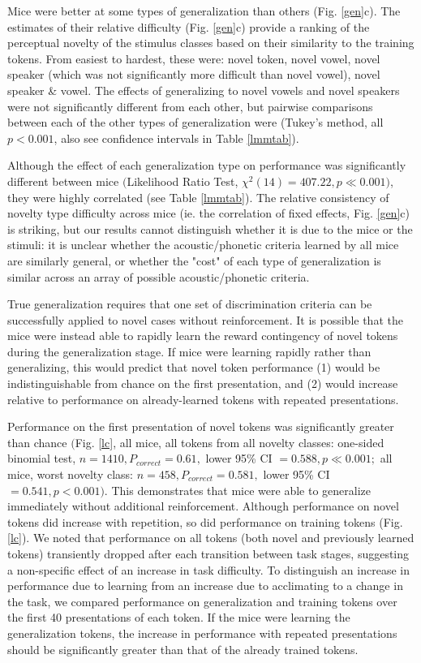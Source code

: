 Mice were better at some types of generalization than others (Fig. \ref{gen}c). The estimates of their relative difficulty (Fig. \ref{gen}c) provide a ranking of the perceptual novelty of the stimulus classes based on their similarity to the training tokens. From easiest to hardest, these were: novel token, novel vowel, novel speaker (which was not significantly more difficult than novel vowel), novel speaker \& vowel. The effects of generalizing to novel vowels and novel speakers were not significantly different from each other, but pairwise comparisons between each of the other types of generalization were (Tukey's method, all $p < 0.001$, also see confidence intervals in Table \ref{lmmtab}).

Although the effect of each generalization type on performance was significantly different between mice $($Likelihood Ratio Test, $\chi^2(14) = 407.22, p \ll 0.001)$, they were highly correlated (see Table \ref{lmmtab}). The relative consistency of novelty type difficulty across mice (ie. the correlation of fixed effects, Fig. \ref{gen}c) is striking, but our results cannot distinguish whether it is due to the mice or the stimuli: it is unclear whether the acoustic/phonetic criteria learned by all mice are similarly general, or whether the "cost" of each type of generalization is similar across an array of possible acoustic/phonetic criteria.

True generalization requires that one set of discrimination criteria can be successfully applied to novel cases without reinforcement. It is possible that the mice were instead able to rapidly learn the reward contingency of novel tokens during the generalization stage. If mice were learning rapidly rather than generalizing, this would predict that novel token performance (1) would be indistinguishable from chance on the first presentation, and (2) would increase relative to performance on already-learned tokens with repeated presentations.


Performance on the first presentation of novel tokens was significantly greater than chance $($Fig. \ref{lc}, all mice, all tokens from all novelty classes: one-sided binomial test, $n=1410, P_{correct} = 0.61,$ lower 95\% CI $= 0.588, p \ll 0.001;$ all mice, worst novelty class:  $n=458, P_{correct} = 0.581,$ lower 95\% CI $= 0.541, p < 0.001)$. This demonstrates that mice were able to generalize immediately without additional reinforcement. Although performance on novel tokens did increase with repetition, so did performance on training tokens (Fig. \ref{lc}). We noted that performance on all tokens (both novel and previously learned tokens) transiently dropped after each transition between task stages, suggesting a non-specific effect of an increase in task difficulty. To distinguish an increase in performance due to learning from an increase due to acclimating to a change in the task, we compared performance on generalization and training tokens over the first 40 presentations of each token. If the mice were learning the generalization tokens, the increase in performance with repeated presentations should be significantly greater than that of the already trained tokens.


